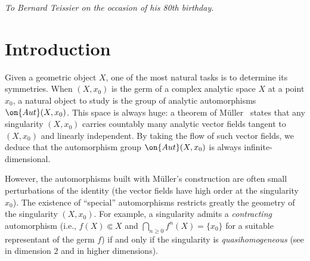\documentclass[11 pt, twoside, a4paper]{amsart}
\title{\mytitle}
\author{Matteo Ruggiero}
\date{\today}
\newcommand{\Kpi}{{\pi}} %
\newcommand{\Ksigma}{{\sigma}} %
\theoremstyle{definition}
\theoremstyle{definition}
\newcommand{\subrelcpct}{\Subset}
\begin{document}
\maketitle
\thispagestyle{empty}

\vspace{-5mm}
\begin{center}
\textit{
To Bernard Teissier on the occasion of his 80th birthday.}
\end{center}

\begin{abstract}\noindent
We show that any holomorphic germ $f \colon (X,x_0) \to (Y,y_0)$ of topological degree $1$ between normal surface singularities can be written as $f=\Kpi \circ \Ksigma$, where $\Kpi \colon Y' \to (Y,y_0)$ is a modification and $\Ksigma \colon (X,x_0) \to (Y',y_1)$ is a local isomorphism sending $x_0$ to a point $y_1 \in \Kpi^{-1}(y_0)$.
A result by Fantini, Favre and myself guarantees that when $f$ is a selfmap, then $(X,x_0)$ is a sandwiched singularity. We give here an alternative proof based on the construction of the associated Kato surfaces, and valuative dynamics.

\end{abstract}




\section*{Introduction}

Given a geometric object $X$, one of the most natural tasks is to determine its symmetries.
When $(X,x_0)$ is the germ of a complex analytic space $X$ at a point $x_0$, a natural object to study is the group of analytic automorphisms $\on{Aut}(X,x_0)$.
This space is always huge: a theorem of M\"uller~\cite[p.230--231]{muller:liegroupsanalyticalgebras} states that any singularity $(X,x_0)$ carries countably many analytic vector fields tangent to $(X,x_0)$ and linearly independent.
By taking the flow of such vector fields, we deduce that the automorphism group $\on{Aut}(X,x_0)$ is always infinite-dimensional.

However, the automorphisms built with M\"uller's construction are often small perturbations of the identity (the vector fields have high order at the singularity $x_0$).
The existence of ``special'' automorphisms restricts greatly the geometry of the singularity $(X,x_0)$.
For example, a singularity admits a \emph{contracting} automorphism (i.e., $f(X) \subrelcpct X$ and $\displaystyle \bigcap_{n \geq 0} f^n(X)=\{x_0\}$ for a suitable representant of the germ $f$) if and only if the singularity is \emph{quasihomogeneous} (see \cite{orlik-wagreich:isolatedsingagsurfCaction, camacho-movasati-scardua:quasihomosteinsurfsing,favre-ruggiero:normsurfsingcontrauto} in dimension $2$ and \cite{ornea-verbitsky:algconesLCKmflspot,morvan:singadmitcontrauto} in higher dimensions).
\end{document}
